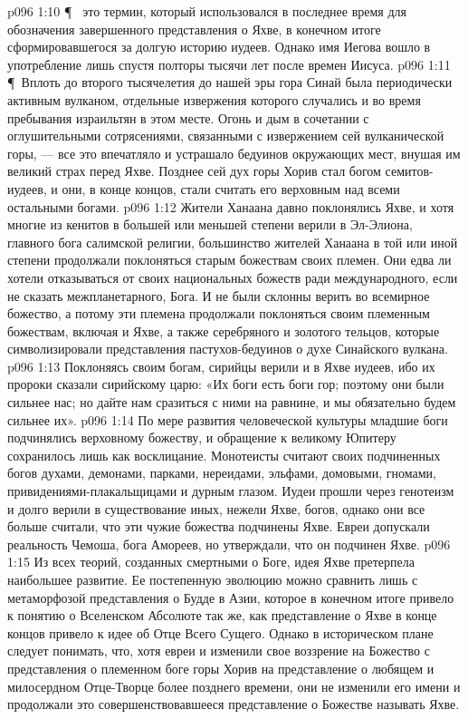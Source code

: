 \vs p096 1:10 \P\  это термин, который использовался в последнее время для обозначения завершенного представления о Яхве, в конечном итоге сформировавшегося за долгую историю иудеев. Однако имя Иегова вошло в употребление лишь спустя полторы тысячи лет после времен Иисуса.
\vs p096 1:11 \P\ Вплоть до второго тысячелетия до нашей эры гора Синай была периодически активным вулканом, отдельные извержения которого случались и во время пребывания израильтян в этом месте. Огонь и дым в сочетании с оглушительными сотрясениями, связанными с извержением сей вулканической горы, --- все это впечатляло и устрашало бедуинов окружающих мест, внушая им великий страх перед Яхве. Позднее сей дух горы Хорив стал богом семитов\hyp{}иудеев, и они, в конце концов, стали считать его верховным над всеми остальными богами.
\vs p096 1:12 Жители Ханаана давно поклонялись Яхве, и хотя многие из кенитов в большей или меньшей степени верили в Эл\hyp{}Элиона, главного бога салимской религии, большинство жителей Ханаана в той или иной степени продолжали поклоняться старым божествам своих племен. Они едва ли хотели отказываться от своих национальных божеств ради международного, если не сказать межпланетарного, Бога. И не были склонны верить во всемирное божество, а потому эти племена продолжали поклоняться своим племенным божествам, включая и Яхве, а также серебряного и золотого тельцов, которые символизировали представления пастухов\hyp{}бедуинов о духе Синайского вулкана.
\vs p096 1:13 Поклоняясь своим богам, сирийцы верили и в Яхве иудеев, ибо их пророки сказали сирийскому царю: «Их боги есть боги гор; поэтому они были сильнее нас; но дайте нам сразиться с ними на равнине, и мы обязательно будем сильнее их».
\vs p096 1:14 По мере развития человеческой культуры младшие боги подчинялись верховному божеству, и обращение к великому Юпитеру сохранилось лишь как восклицание. Монотеисты считают своих подчиненных богов духами, демонами, парками, нереидами, эльфами, домовыми, гномами, привидениями\hyp{}плакальщицами и дурным глазом. Иудеи прошли через генотеизм и долго верили в существование иных, нежели Яхве, богов, однако они все больше считали, что эти чужие божества подчинены Яхве. Евреи допускали реальность Чемоша, бога Амореев, но утверждали, что он подчинен Яхве.
\vs p096 1:15 Из всех теорий, созданных смертными о Боге, идея Яхве претерпела наибольшее развитие. Ее постепенную эволюцию можно сравнить лишь с метаморфозой представления о Будде в Азии, которое в конечном итоге привело к понятию о Вселенском Абсолюте так же, как представление о Яхве в конце концов привело к идее об Отце Всего Сущего. Однако в историческом плане следует понимать, что, хотя евреи и изменили свое воззрение на Божество с представления о племенном боге горы Хорив на представление о любящем и милосердном Отце\hyp{}Творце более позднего времени, они не изменили его имени и продолжали это совершенствовавшееся представление о Божестве называть Яхве.
